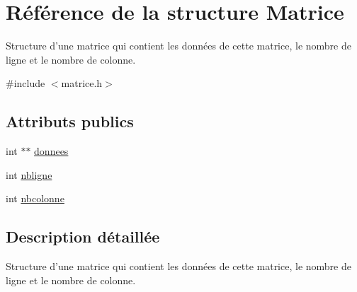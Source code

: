 \hypertarget{structMatrice}{\section{\-Référence de la structure \-Matrice}
\label{structMatrice}
}


\-Structure d'une matrice qui contient les données de cette matrice, le nombre de ligne et le nombre de colonne.  




{\ttfamily \#include $<$matrice.\-h$>$}

\subsection*{\-Attributs publics}
\begin{DoxyCompactItemize}
\item 
int $\ast$$\ast$ \hyperlink{structMatrice_a4ed59291b88d3ed8b30b3f74d4acf6b3}{donnees}
\item 
int \hyperlink{structMatrice_a27d7f184cab0fce2a40e173afca96f9f}{nbligne}
\item 
int \hyperlink{structMatrice_a7bf8157909d60e8ff841b26fc5cb2bab}{nbcolonne}
\end{DoxyCompactItemize}


\subsection{\-Description détaillée}
\-Structure d'une matrice qui contient les données de cette matrice, le nombre de ligne et le nombre de colonne. 

